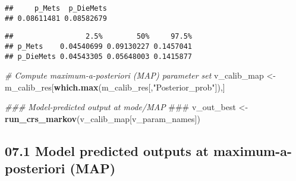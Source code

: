 \documentclass[
]{article}
\newenvironment{Shaded}{\begin{snugshade}}{\end{snugshade}}
\newcommand{\AlertTok}[1]{\textcolor[rgb]{0.94,0.16,0.16}{#1}}
\newcommand{\CommentTok}[1]{\textcolor[rgb]{0.56,0.35,0.01}{\textit{#1}}}
\newcommand{\DataTypeTok}[1]{\textcolor[rgb]{0.13,0.29,0.53}{#1}}
\newcommand{\FloatTok}[1]{\textcolor[rgb]{0.00,0.00,0.81}{#1}}
\newcommand{\KeywordTok}[1]{\textcolor[rgb]{0.13,0.29,0.53}{\textbf{#1}}}
\newcommand{\NormalTok}[1]{#1}
\newcommand{\StringTok}[1]{\textcolor[rgb]{0.31,0.60,0.02}{#1}}
\begin{document}
\begin{verbatim}
##     p_Mets  p_DieMets 
## 0.08611481 0.08582679
\end{verbatim}

\begin{Shaded}
\end{Shaded}

\begin{verbatim}
##                 2.5%        50%     97.5%
## p_Mets    0.04540699 0.09130227 0.1457041
## p_DieMets 0.04543305 0.05648003 0.1415877
\end{verbatim}

\begin{Shaded}
\begin{Highlighting}[]
\CommentTok{# Compute maximum-a-posteriori (MAP) parameter set}
\NormalTok{v_calib_map <-}\StringTok{ }\NormalTok{m_calib_res[}\KeywordTok{which.max}\NormalTok{(m_calib_res[,}\StringTok{"Posterior_prob"}\NormalTok{]),]}

\CommentTok{### Model-predicted output at mode/MAP }\AlertTok{###}
\NormalTok{v_out_best <-}\StringTok{ }\KeywordTok{run_crs_markov}\NormalTok{(v_calib_map[v_param_names])}
\end{Highlighting}
\end{Shaded}

\hypertarget{model-predicted-outputs-at-maximum-a-posteriori-map}{%
\subsection{07.1 Model predicted outputs at maximum-a-posteriori
(MAP)}\label{model-predicted-outputs-at-maximum-a-posteriori-map}}
\end{document}
